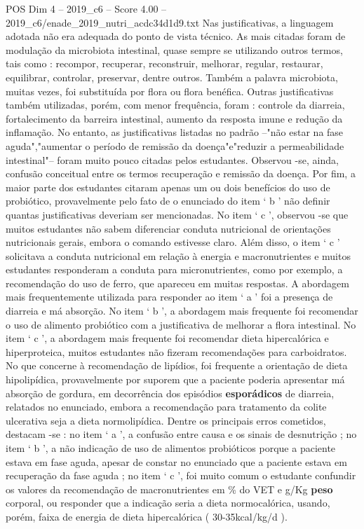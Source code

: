 \begin{textsample}{POS Dim 4 – 2019\_c6 – Score 4.00 – 2019\_c6/enade\_2019\_nutri\_acdc34d1d9.txt}
Nas justificativas, a linguagem adotada não era adequada do ponto de vista técnico.
As mais citadas foram de modulação da microbiota intestinal, quase sempre se utilizando outros termos, tais como : recompor, recuperar, reconstruir, melhorar, regular, restaurar, equilibrar, controlar, preservar, dentre outros.
Também a palavra microbiota, muitas vezes, foi substituída por flora ou flora benéfica.
Outras justificativas também utilizadas, porém, com menor frequência, foram : controle da diarreia, fortalecimento da barreira intestinal, aumento da resposta imune e redução da inflamação.
No entanto, as justificativas listadas no padrão –"não estar na fase aguda","aumentar o período de remissão da doença"e"reduzir a permeabilidade intestinal"– foram muito pouco citadas pelos estudantes.
Observou -se, ainda, confusão conceitual entre os termos recuperação e remissão da doença.
Por fim, a maior parte dos estudantes citaram apenas um ou dois benefícios do uso de probiótico, provavelmente pelo fato de o enunciado do item ‘ b ’ não definir quantas justificativas deveriam ser mencionadas.
No item ‘ c ’, observou -se que muitos estudantes não sabem diferenciar conduta nutricional de orientações nutricionais gerais, embora o comando estivesse claro.
Além disso, o item ‘ c ’ solicitava a conduta nutricional em relação à energia e macronutrientes e muitos estudantes responderam a conduta para micronutrientes, como por exemplo, a recomendação do uso de ferro, que apareceu em muitas respostas.
A abordagem mais frequentemente utilizada para responder ao item ‘ a ’ foi a presença de diarreia e má absorção.
No item ‘ b ’, a abordagem mais frequente foi recomendar o uso de alimento probiótico com a justificativa de melhorar a flora intestinal.
No item ‘ c ’, a abordagem mais frequente foi recomendar dieta hipercalórica e hiperproteica, muitos estudantes não fizeram recomendações para carboidratos.
No que concerne à recomendação de lipídios, foi frequente a orientação de dieta hipolipídica, provavelmente por suporem que a paciente poderia apresentar má absorção de gordura, em decorrência dos episódios \textbf{esporádicos} de diarreia, relatados no enunciado, embora a recomendação para tratamento da colite ulcerativa seja a dieta normolipídica.
Dentre os principais erros cometidos, destacam -se : no item ‘ a ’, a confusão entre causa e os sinais de desnutrição ; no item ‘ b ’, a não indicação de uso de alimentos probióticos porque a paciente estava em fase aguda, apesar de constar no enunciado que a paciente estava em recuperação da fase aguda ; no item ‘ c ’, foi muito comum o estudante confundir os valores da recomendação de macronutrientes em \% do VET e g/Kg \textbf{peso} corporal, ou responder que a indicação seria a dieta normocalórica, usando, porém, faixa de energia de dieta hipercalórica ( 30-35kcal/kg/d ).

\end{textsample}
